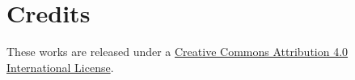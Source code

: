 \documentclass{article}
\begin{document}
\section*{Credits}
\label{sec:credits}
These works are released under a \href{https://creativecommons.org/licenses/by/4.0/}{Creative Commons Attribution 4.0 International License}.




\end{document}

